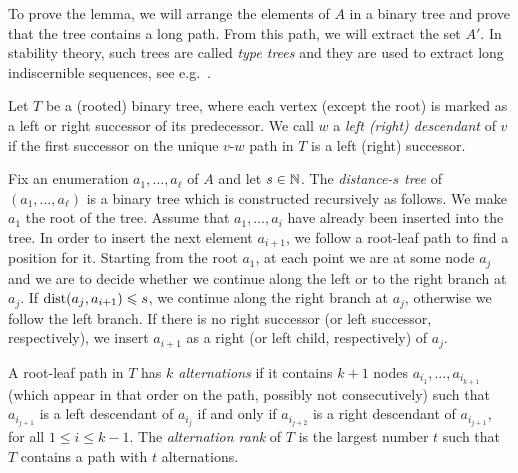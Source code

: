 
To prove the lemma, we will arrange the elements of $A$ in a binary tree
and prove that the tree contains a long path. From this path, we will 
extract the set $A'$. In stability theory, such trees are called \emph{type trees} and they are used to extract long indiscernible sequences, see e.g.~\cite{malliaris2014regularity}. 

Let $T$ be a (rooted) binary tree, where each vertex (except the root) is 
marked as a left or right successor of its predecessor. We call $w$ 
a \emph{left (right) descendant} of $v$ if the first successor on the unique
$v$-$w$ path in $T$ is a left (right) successor.

Fix an enumeration $a_1,\ldots, a_{\ell}$ of $A$ and let $s\in \mathbb{N}$. 
The \emph{distance-$s$ tree}
of $(a_1,\ldots,a_{\ell})$ is a binary tree which is constructed recursively as 
follows. We make $a_1$ the root of the tree. Assume that $a_1,\ldots, a_i$
have already been inserted into the tree. In order to insert the next element $a_{i+1}$, we follow a root-leaf path to find a position for it. 
Starting from the root $a_1$, at each point we are at some node $a_j$ and we are to decide whether we continue along the left or to the right branch at $a_j$.
If $\mathrm{dist}(a_j,a_{i+1})\leqslant s$, we continue along the right branch at $a_j$, otherwise we follow the left branch. If 
there is no right successor (or left successor, respectively), we insert $a_{i+1}$ 
as a right (or left child, respectively) of $a_j$. 

A root-leaf path in $T$ has \emph{$k$ alternations} 
if it contains $k+1$ nodes $a_{i_1},\ldots, a_{i_{k+1}}$ (which appear
in that order on the path, possibly not consecutively) such that $a_{i_{j+1}}$ is a left descendant of $a_{i_j}$
if and only if $a_{i_{j+2}}$ is a right descendant of $a_{i_{j+1}}$, for all $1\leq i\leq k-1$. 
The \emph{alternation rank} of $T$ is the largest number $t$ such that 
$T$ contains a path with $t$ alternations.


